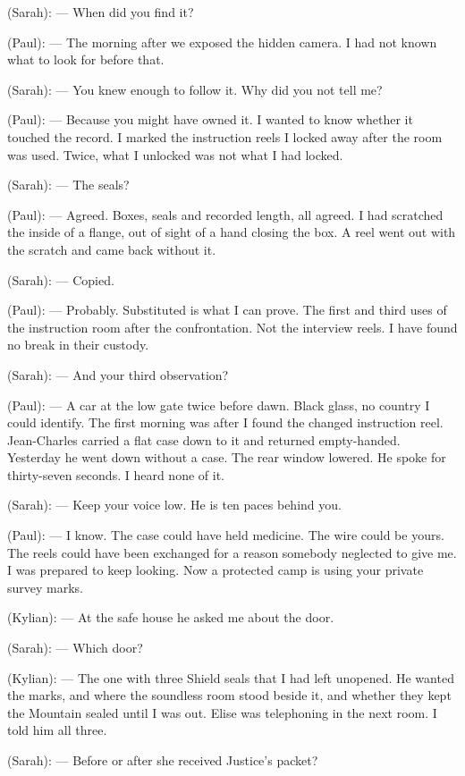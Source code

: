 \begin{room}
(Sarah): --- When did you find it?

(Paul): --- The morning after we exposed the hidden camera. I had not known what to look for before that.

(Sarah): --- You knew enough to follow it. Why did you not tell me?

(Paul): --- Because you might have owned it. I wanted to know whether it touched the record. I marked the instruction reels I locked away after the room was used. Twice, what I unlocked was not what I had locked.

(Sarah): --- The seals?

(Paul): --- Agreed. Boxes, seals and recorded length, all agreed. I had scratched the inside of a flange, out of sight of a hand closing the box. A reel went out with the scratch and came back without it.

(Sarah): --- Copied.

(Paul): --- Probably. Substituted is what I can prove. The first and third uses of the instruction room after the confrontation. Not the interview reels. I have found no break in their custody.

(Sarah): --- And your third observation?

(Paul): --- A car at the low gate twice before dawn. Black glass, no country I could identify. The first morning was after I found the changed instruction reel. Jean-Charles carried a flat case down to it and returned empty-handed. Yesterday he went down without a case. The rear window lowered. He spoke for thirty-seven seconds. I heard none of it.

(Sarah): --- Keep your voice low. He is ten paces behind you.

(Paul): --- I know. The case could have held medicine. The wire could be yours. The reels could have been exchanged for a reason somebody neglected to give me. I was prepared to keep looking. Now a protected camp is using your private survey marks.

(Kylian): --- At the safe house he asked me about the door.

(Sarah): --- Which door?

(Kylian): --- The one with three Shield seals that I had left unopened. He wanted the marks, and where the soundless room stood beside it, and whether they kept the Mountain sealed until I was out. Elise was telephoning in the next room. I told him all three.

(Sarah): --- Before or after she received Justice's packet?


\end{room}
